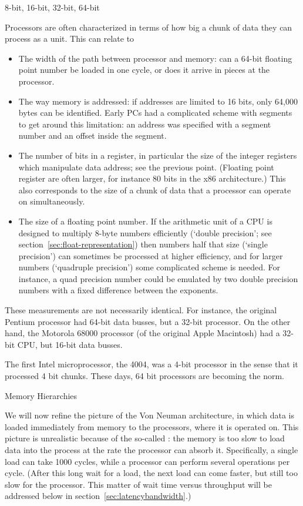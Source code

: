  {8-bit, 16-bit, 32-bit, 64-bit}

Processors are often characterized in terms of how big a chunk of data
they can process as a unit. This can relate to
\begin{itemize}
\item The width of the path between processor and memory: can a 64-bit
  floating point number be loaded in one cycle, or does it arrive in
  pieces at the processor.
\item The way memory is addressed: if addresses are limited to 16
  bits, only 64,000 bytes can be identified. Early PCs had a
  complicated scheme with segments to get around this limitation: an
  address was specified with a segment number and an offset inside the segment.
\item The number of bits in a register, in particular the size of the
  integer registers which manipulate data address; see the previous
  point. (Floating point register are often larger, for instance 80
  bits in the x86 architecture.) This also corresponds to the size of
  a chunk of data that a processor can operate on simultaneously.
\item The size of a floating point number. If the arithmetic unit of a
  CPU is designed to multiply 8-byte numbers efficiently (`double
  precision'; see section~\ref{sec:float-representation}) then numbers half
  that size (`single precision') can sometimes be processed at higher
  efficiency, and for larger numbers (`quadruple precision') some
  complicated scheme is needed. For instance, a quad precision number
  could be emulated by two double precision numbers with a fixed
  difference between the exponents.
\end{itemize}
These measurements are not necessarily identical. For instance, the
original Pentium processor had 64-bit data busses, but a 32-bit
processor. On the other hand, the Motorola 68000 processor (of the
original Apple Macintosh) had a 32-bit CPU, but 16-bit data busses.

The first Intel microprocessor, the 4004, was a 4-bit
processor in the sense that it processed 4 bit chunks. These days,
64 bit processors are becoming the norm.

 {Memory Hierarchies}
\label{sec:hierarchy}

We will now refine the picture of the Von Neuman architecture, in
which data is loaded immediately from memory to the processors, where
it is operated on. This picture is unrealistic because of the
so-called : the memory is too slow to load data
into the process at the rate the processor can absorb
it. Specifically, a single load can take 1000 cycles, while a
processor can perform several operations per cycle. (After this long
wait for a load, the next load can come faster, but still too slow for
the processor. This matter of wait time versus throughput will be
addressed below in section~\ref{sec:latencybandwidth}.)

